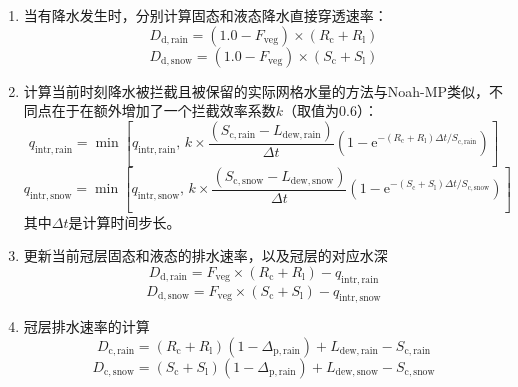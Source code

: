 \begin{enumerate}
  \item 当有降水发生时，分别计算固态和液态降水直接穿透速率：
    \begin{equation}
      D_{\mathrm{d,rain}}=\left(1.0-F_{\mathrm{veg}}\right) \times (R_{\mathrm{c}}+R_{\mathrm{l}})
    \end{equation}
    \begin{equation}
      D_{\mathrm{d,snow}}=\left(1.0-F_{\mathrm{veg}}\right) \times (S_{\mathrm{c}}+S_{\mathrm{l}})
    \end{equation}
  \item 计算当前时刻降水被拦截且被保留的实际网格水量的方法与Noah-MP类似，不同点在于在额外增加了一个拦截效率系数$k$（取值为0.6）：
    \begin{equation}
      q_{\mathrm{intr,rain}} = \min\left[q_{\mathrm{intr,rain}},\,  k \times \frac{(S_{\mathrm{c,rain}} - L_{\mathrm{dew,rain}})}{\Delta{t}} \left(1-{\mathrm e}^{-\left(R_{\mathrm{c}}+R_{\mathrm{l}}\right)\Delta{t}/S_{\mathrm{c,rain}}}\right)\right]
    \end{equation}
    \begin{equation}
      q_{\mathrm{intr,snow}} = \min\left[q_{\mathrm{intr,snow}},\, k \times \frac{(S_{\mathrm{c,snow}} - L_{\mathrm{dew,snow}})}{\Delta{t}}\left(1-{\mathrm e}^{-\left(S_{\mathrm{c}}+S_{\mathrm{l}}\right)\Delta{t}/S_{\mathrm{c,snow}}}\right)\right]
    \end{equation}
    其中${\Delta{t}}$是计算时间步长。
  \item 更新当前冠层固态和液态的排水速率，以及冠层的对应水深
    \begin{equation}
      D_{\mathrm{d,rain}}=F_{\mathrm{veg}} \times (R_{\mathrm{c}}+R_{\mathrm{l}})-q_{\mathrm{intr,rain}}
    \end{equation}
    \begin{equation}
      D_{\mathrm{d,snow}}=F_{\mathrm{veg}} \times (S_{\mathrm{c}}+S_{\mathrm{l}})-q_{\mathrm{intr,snow}}
    \end{equation}
  \item 冠层排水速率的计算
    \begin{equation}
      D_{\mathrm{c,rain}}=\left(R_{\mathrm{c}}+R_{\mathrm{l}}\right)\left(1-\Delta_{\mathrm{p,rain}}\right)+L_{\mathrm{dew,rain}}-S_{\mathrm{c,rain}}
    \end{equation}
    \begin{equation}
      D_{\mathrm{c,snow}}=\left(S_{\mathrm{c}}+S_{\mathrm{l}}\right)\left(1-\Delta_{\mathrm{p,rain}}\right)+L_{\mathrm{dew,snow}}-S_{\mathrm{c,snow}}
    \end{equation}

\end{enumerate}
